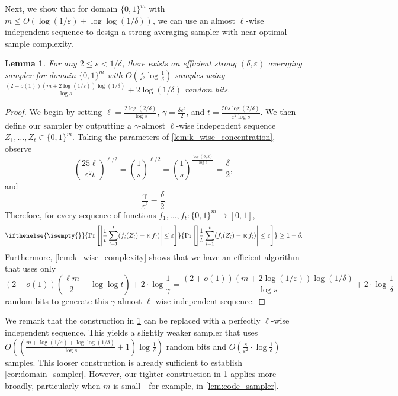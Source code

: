 \documentclass[11pt,letterpaper]{article}
\newtheorem{lemma}[theorem]{Lemma}
\DeclareMathOperator*{\E}{\mathbb{E}}
\newcommand{\eps}{\varepsilon}
\newcommand{\1}{\mathbbm{1}}
\newcommand{\abs}[1]{\left|#1\right| }
\newcommand{\tuple}[1]{\left(#1\right)}
\newcommand{\zo}{\{0, 1\}}
\newcommand{\Prb}[2][]{ \ifthenelse{\isempty{#1}}
  {\Pr\left[#2\right]}
  {\Pr_{#1}\left[#2\right]} }
\begin{document}
Next, we show that for domain $\zo^m$ with $m \le O(\log (1 / \eps) + \log\log (1 / \delta))$, we can use an almost $\ell$-wise independent sequence to design a strong averaging sampler with near-optimal sample complexity. 

\begin{lemma}
\label{lem:general_ell_wise_sampler}
    For any $2 \le s < 1 / \delta$, there exists an efficient strong $(\delta, \eps)$ averaging sampler for domain $\zo^m$ with $O(\frac{s}{\eps^{2}}\log \frac{1}{\delta})$ samples using 
    ${\frac{(2 + o(1))(m + 2\log(1 / \eps))\log(1 / \delta)}{\log s}} + 2 \log (1 / \delta)$
    random bits.
\end{lemma}
\begin{proof}
    We begin by setting $\ell = \frac{2\log(2 / \delta)}{\log s}$, $\gamma = \frac{\delta\eps^\ell}{2}$, and $t = \frac{50s \log (2 / \delta)}{  \eps^{2} \log s}$. We then define our sampler by outputting a $\gamma$-almost $\ell$-wise independent  sequence $Z_1, \dots, Z_t \in \zo^m$. 
    Taking the parameters of \cref{lem:k_wise_concentration}, observe \[
        \tuple{\frac{25{\ell}}{\eps^2 {t}}}^{\ell/2}
        = \tuple{\frac{1}{s}}^{\ell/2} = \tuple{\frac{1}{s}}^{\frac{\log(2/\delta)}{\log s}}
        =  \frac{\delta}{2},
    \]
    and \[
        \frac{\gamma}{\eps^\ell} = \frac{\delta}{2}.
    \]
     Therefore, for every sequence of functions $f_1, \dots, f_t : \zo^m \to [0, 1]$, \[
        \Prb{\abs{\frac{1}{t}\sum_{i=1}^t (f_i(Z_i) - \E f_i)} \le \eps} \ge 1 - \delta.
    \]
     Furthermore, \cref{lem:k_wise_complexity} shows that we have an efficient algorithm that uses only \[
     (2 + o(1))\tuple{\frac{\ell m}{2} + \log\log t} + 2 \cdot {\log\frac{1}{\gamma}}  = 
     {\frac{(2 + o(1))(m + 2\log(1 / \eps))\log(1 / \delta)}{\log s}} + 2 \cdot {\log\frac{1}{\delta}}
     \]
    random bits to generate this $\gamma$-almost $\ell$-wise independent  sequence.
\end{proof}

We remark that the construction in \cref{lem:general_ell_wise_sampler} can be replaced with a perfectly \( \ell \)-wise independent sequence. This yields a slightly weaker sampler that uses  
$
O\left( \left( \frac{m + \log(1 / \eps) + \log \log(1 / \delta)}{\log s} + 1 \right) \log \frac{1}{\delta} \right)
$
random bits and  
$
O\left( \frac{s}{\eps^2} \cdot \log \frac{1}{\delta} \right)
$
samples.  
This looser construction is already sufficient to establish \cref{cor:domain_sampler}. However, our tighter construction in \cref{lem:general_ell_wise_sampler} applies more broadly, particularly when \( m \) is small—for example, in \cref{lem:code_sampler}.
\end{document}
